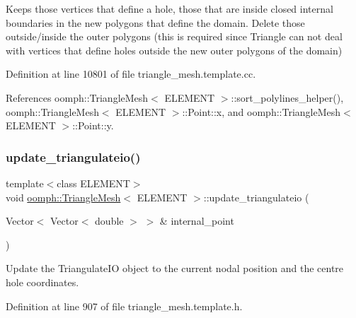 Keeps those vertices that define a hole, those that are inside closed internal boundaries in the new polygons that define the domain. Delete those outside/inside the outer polygons (this is required since Triangle can not deal with vertices that define holes outside the new outer polygons of the domain) 



Definition at line 10801 of file triangle\+\_\+mesh.\+template.\+cc.



References oomph\+::\+Triangle\+Mesh$<$ E\+L\+E\+M\+E\+N\+T $>$\+::sort\+\_\+polylines\+\_\+helper(), oomph\+::\+Triangle\+Mesh$<$ E\+L\+E\+M\+E\+N\+T $>$\+::\+Point\+::x, and oomph\+::\+Triangle\+Mesh$<$ E\+L\+E\+M\+E\+N\+T $>$\+::\+Point\+::y.

\mbox{\label{classoomph_1_1TriangleMesh_ae4922667cdfd747a3fbc5d391933ce31}} 
\subsubsection{\texorpdfstring{update\+\_\+triangulateio()}{update\_triangulateio()}\hspace{0.1cm}{\footnotesize\ttfamily [1/2]}}
{\footnotesize\ttfamily template$<$class E\+L\+E\+M\+E\+NT$>$ \\
void \hyperlink{classoomph_1_1TriangleMesh}{oomph\+::\+Triangle\+Mesh}$<$ E\+L\+E\+M\+E\+NT $>$\+::update\+\_\+triangulateio (\begin{DoxyParamCaption}\item[{Vector$<$ Vector$<$ double $>$ $>$ \&}]{internal\+\_\+point }\end{DoxyParamCaption})\hspace{0.3cm}{\ttfamily [inline]}}



Update the Triangulate\+IO object to the current nodal position and the centre hole coordinates. 



Definition at line 907 of file triangle\+\_\+mesh.\+template.\+h.

\mbox{\label{classoomph_1_1TriangleMesh_a27153961f8b691a4cd50bd6c83ffc4d3}} 

